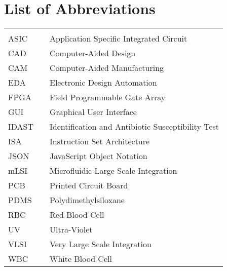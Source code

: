 \chapter*{List of Abbreviations}
\begin{center}
  \begin{tabular}{lll}
    \hspace*{2em} & \hspace*{1in} & \hspace*{4.5in} \\
    ASIC & \dotfill & Application Specific Integrated Circuit \\
    CAD  & \dotfill & Computer-Aided Design \\
    CAM  & \dotfill & Computer-Aided Manufacturing \\
    EDA  & \dotfill & Electronic Design Automation \\
    FPGA & \dotfill & Field Programmable Gate Array \\
    GUI  & \dotfill & Graphical User Interface \\
    IDAST &\dotfill & Identification and Antibiotic Susceptibility Test\\
    ISA	 & \dotfill & Instruction Set Architecture \\
    JSON & \dotfill & JavaScript Object Notation \\
    mLSI & \dotfill & Microfluidic Large Scale Integration \\
    PCB  & \dotfill & Printed Circuit Board \\
    PDMS & \dotfill & Polydimethylsiloxane \\
    RBC  & \dotfill & Red Blood Cell \\
    UV	 & \dotfill & Ultra-Violet \\
    VLSI & \dotfill & Very Large Scale Integration \\
    WBC  & \dotfill & White Blood Cell \\
  \end{tabular}
\end{center}
\cleardoublepage


\newpage
\endofprelim
